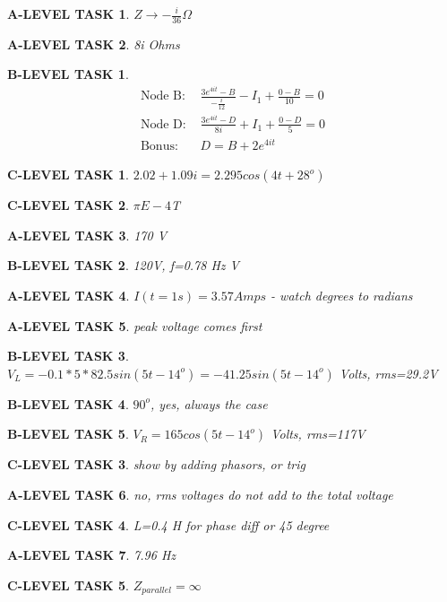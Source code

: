 \documentclass{book}
\numberwithin{equation}{section}
\newtheorem{alevel}{A-LEVEL TASK}
\newtheorem{blevel}{B-LEVEL TASK}
\newtheorem{clevel}{C-LEVEL TASK}
\theoremstyle{definition}
\begin{document}
\begin{alevel}$Z\rightarrow -\frac{i}{36} \Omega$\end{alevel}
\begin{alevel}8i Ohms\end{alevel}
\begin{blevel}\begin{align*}
\text{Node B: }&\frac{3e^{4it}-B}{-\frac{i}{12}}-I_1+\frac{0-B}{10}=0\\
\text{Node D: }&\frac{3e^{4it}-D}{8i}+I_1+\frac{0-D}{5}=0\\
\text{Bonus: }&D=B+2e^{4it}
\end{align*}
\end{blevel}
\begin{clevel}$2.02+1.09i=2.295cos(4t+28^o)$
\end{clevel}
\begin{clevel}$\pi E-4$T\end{clevel}
\begin{alevel}170 V\end{alevel}
\begin{blevel}120V, f=0.78 Hz V\end{blevel}
\begin{alevel}$I(t=1s)=3.57 Amps$ - watch degrees to radians\end{alevel}
\begin{alevel}peak voltage comes first\end{alevel}
\begin{blevel}$V_L=-0.1*5*82.5sin(5t-14^o)=-41.25sin(5t-14^o)$ Volts, rms=29.2V\end{blevel}
\begin{blevel}$90^o$, yes, always the case\end{blevel}
\begin{blevel}$V_R=165cos(5t-14^o)$ Volts, rms=117V\end{blevel}
\begin{clevel}show by adding phasors, or trig\end{clevel}
\begin{alevel}no, rms voltages do not add to the total voltage\end{alevel}
\begin{clevel}L=0.4 H for phase diff or 45 degree\end{clevel}
\begin{alevel} 7.96 Hz\end{alevel}
\begin{clevel} $Z_{parallel}=\infty$\end{clevel}
\end{document}
